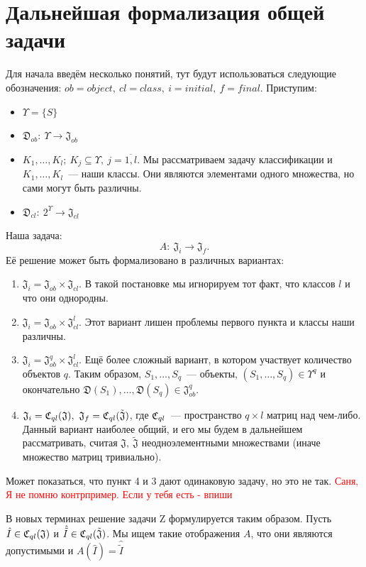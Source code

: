 \documentclass[a4paper, 12pt]{report}
\begin{document}
\section{Дальнейшая формализация общей задачи}
Для начала введём несколько понятий, тут будут использоваться следующие обозначения: $ob = object,\ cl=class,\ i=initial,\ f=final$.
Приступим:
\begin{itemize}
  \item $\Upsilon=\{S\}$
  \item $\mathfrak{D}_{ob}:\ \Upsilon\rightarrow\mathfrak{J}_{ob}$
  \item $K_1,\ldots,K_l;\ K_j \subseteq \Upsilon,\ j=\overline{1,l}$. Мы рассматриваем задачу классификации и $K_1,\ldots,K_l$~--- наши классы. Они являются элементами одного множества, но сами могут быть различны.
  \item $\mathfrak{D}_{cl}:\ 2^{\Upsilon}\rightarrow\mathfrak{J}_{cl}$
\end{itemize}
Наша задача: 
\[
A:\ \mathfrak{J}_i \rightarrow \mathfrak{J}_f.
\] 
Её решение может быть формализовано в различных вариантах:
\begin{enumerate}
  \item $\mathfrak{J}_i = \mathfrak{J}_{ob}\times\mathfrak{J}_{cl}$. В такой постановке мы игнорируем тот факт, что классов $l$ и что они однородны.
  \item $\mathfrak{J}_i = \mathfrak{J}_{ob}\times\mathfrak{J}_{cl}^l$. Этот вариант лишен проблемы первого пункта и классы наши различны.
  \item $\mathfrak{J}_i = \mathfrak{J}_{ob}^q\times\mathfrak{J}_{cl}^l$. Ещё более сложный вариант, в котором участвует количество объектов $q$. Таким образом, $S_1,\ldots,S_q$~--- объекты, $(S_1,\ldots,S_q)\in\Upsilon^q$ и окончательно $\mathfrak{D}(S_1),\ldots,\mathfrak{D}(S_q) \in \mathfrak{J}_{ob}^q$.
  \item $\mathfrak{J}_i = \Cql(\mathfrak{J}),\ \mathfrak{J}_f = \Cql(\tilde{\mathfrak{J}})$, где $\mathfrak{C}_{ql}$~--- пространство $q\times l$ матриц над чем-либо. Данный вариант наиболее общий, и его мы будем в дальнейшем рассматривать, считая $\mathfrak{J},\ \tilde{\mathfrak{J}}$ неодноэлементными множествами (иначе множество матриц тривиально). 
\end{enumerate}

Может показаться, что пункт 4 и 3 дают одинаковую задачу, но это не так. \textcolor{red}{Саня, Я не помню контрпример. Если у тебя есть - впиши}

В новых терминах решение задачи Z формулируется таким образом. Пусть $\hat{I} \in \mathfrak{C}_{ql}(\mathfrak{J})$ и $\hat{\tilde{I}} \in \mathfrak{C}_{ql}(\tilde{\mathfrak{J}})$. Мы ищем такие отображения $A$, что они являются допустимыми и $A(\hat{I}) = \hat{\tilde{I}}$
\end{document}
